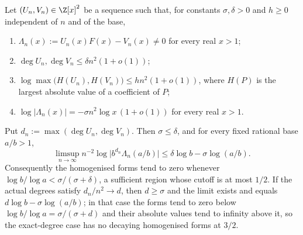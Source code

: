 \documentclass[11pt]{article}
\begin{document}
\begin{theorem}\label{long1049:res:archcap}
Let $(U_n,V_n)\in\Z[x]^{2}$ be a sequence such that, for constants
$\sigma,\delta>0$ and $h\ge0$ independent of $n$ and of the base,
\begin{enumerate}
\item $\Lambda_n(x):=U_n(x)F(x)-V_n(x)\ne0$ for every real $x>1$;
\item $\deg U_n,\deg V_n\le\delta n^{2}(1+o(1))$;
\item $\log\max\bigl(H(U_n),H(V_n)\bigr)\le hn^{2}(1+o(1))$, where $H(P)$ is the
largest absolute value of a coefficient of $P$;
\item $\log|\Lambda_n(x)|=-\sigma n^{2}\log x\,(1+o(1))$ for every real $x>1$.
\end{enumerate}
Put $d_n:=\max(\deg U_n,\deg V_n)$.  Then $\sigma\le\delta$, and for every fixed
rational base $a/b>1$,
\[
 \limsup_{n\to\infty}n^{-2}\log\bigl|b^{d_n}\Lambda_n(a/b)\bigr|
 \le\delta\log b-\sigma\log(a/b).
\]
Consequently the homogenised forms tend to zero whenever
$\log b/\log a<\sigma/(\sigma+\delta)$, a sufficient region whose cutoff is at
most $1/2$.  If the actual degrees satisfy $d_n/n^{2}\to d$, then $d\ge\sigma$
and the limit exists and equals $d\log b-\sigma\log(a/b)$; in that case the
forms tend to zero below $\log b/\log a=\sigma/(\sigma+d)$ and their absolute
values tend to infinity above it, so the exact-degree case has no decaying
homogenised forms at $3/2$.
\end{theorem}
\end{document}
